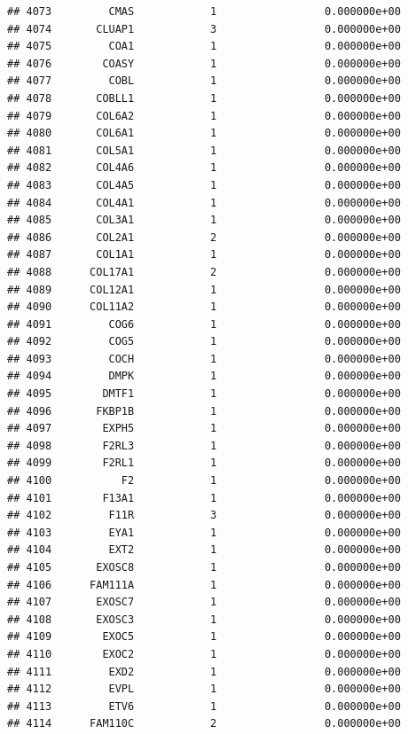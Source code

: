 \documentclass[
]{article}
\begin{document}
\begin{verbatim}
## 4073         CMAS            1                 0.000000e+00
## 4074       CLUAP1            3                 0.000000e+00
## 4075         COA1            1                 0.000000e+00
## 4076        COASY            1                 0.000000e+00
## 4077         COBL            1                 0.000000e+00
## 4078       COBLL1            1                 0.000000e+00
## 4079       COL6A2            1                 0.000000e+00
## 4080       COL6A1            1                 0.000000e+00
## 4081       COL5A1            1                 0.000000e+00
## 4082       COL4A6            1                 0.000000e+00
## 4083       COL4A5            1                 0.000000e+00
## 4084       COL4A1            1                 0.000000e+00
## 4085       COL3A1            1                 0.000000e+00
## 4086       COL2A1            2                 0.000000e+00
## 4087       COL1A1            1                 0.000000e+00
## 4088      COL17A1            2                 0.000000e+00
## 4089      COL12A1            1                 0.000000e+00
## 4090      COL11A2            1                 0.000000e+00
## 4091         COG6            1                 0.000000e+00
## 4092         COG5            1                 0.000000e+00
## 4093         COCH            1                 0.000000e+00
## 4094         DMPK            1                 0.000000e+00
## 4095        DMTF1            1                 0.000000e+00
## 4096       FKBP1B            1                 0.000000e+00
## 4097        EXPH5            1                 0.000000e+00
## 4098        F2RL3            1                 0.000000e+00
## 4099        F2RL1            1                 0.000000e+00
## 4100           F2            1                 0.000000e+00
## 4101        F13A1            1                 0.000000e+00
## 4102         F11R            3                 0.000000e+00
## 4103         EYA1            1                 0.000000e+00
## 4104         EXT2            1                 0.000000e+00
## 4105       EXOSC8            1                 0.000000e+00
## 4106      FAM111A            1                 0.000000e+00
## 4107       EXOSC7            1                 0.000000e+00
## 4108       EXOSC3            1                 0.000000e+00
## 4109        EXOC5            1                 0.000000e+00
## 4110        EXOC2            1                 0.000000e+00
## 4111         EXD2            1                 0.000000e+00
## 4112         EVPL            1                 0.000000e+00
## 4113         ETV6            1                 0.000000e+00
## 4114      FAM110C            2                 0.000000e+00

\end{verbatim}
\end{document}
